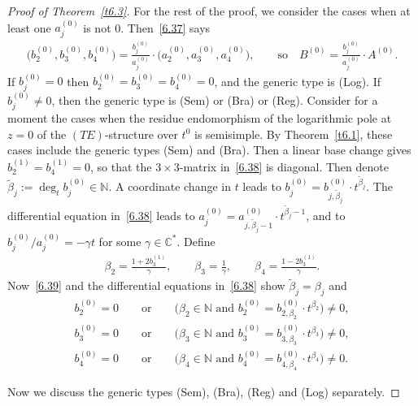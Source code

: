 \documentclass[pdftex]{sigma}%
\numberwithin{equation}{section}
\numberwithin{figure}{section}
\newcommand{\N}{{\mathbb N}}
\newcommand{\C}{{\mathbb C}}
\newcommand{\www}{\widetilde}
\begin{document}
\begin{proof}[Proof of Theorem~\ref{t6.3}]
For the rest of the proof, we consider the cases
when at least one $a_j^{(0)}$ is not 0.
Then~\eqref{6.37} says
\begin{gather}\label{6.39}
\big(b_2^{(0)},b_3^{(0)},b_4^{(0)}\big)=\frac{b_j^{(0)}}{a_j^{(0)}}
\cdot \big(a_2^{(0)},a_3^{(0)},a_4^{(0)}\big),\qquad
\text{so} \quad B^{(0)} = \frac{b_j^{(0)}}{a_j^{(0)}}\cdot A^{(0)}.
\end{gather}
If $b_j^{(0)}=0$ then $b_2^{(0)}=b_3^{(0)}=b_4^{(0)}=0$,
and the generic type is (Log).
If $b_j^{(0)}\neq 0$, then the generic type is
(Sem) or (Bra) or (Reg).
Consider for a moment the cases when the residue endomorphism
of the logarithmic pole at $z=0$ of the $(TE)$-structure
over $t^0$ is semisimple. By Theorem~\ref{t6.1}, these cases
include the generic types (Sem) and (Bra).
Then a linear base change gives $b_2^{(1)}=b_4^{(1)}=0$,
so that the $3\times 3$-matrix in~\eqref{6.38} is diagonal.
Then denote $\www\beta_j:=\deg_t b_j^{(0)}\in\N$.
A coordinate change in $t$ leads to
$b_j^{(0)}=b_{j,\www\beta_j}^{(0)}\cdot t^{\www\beta_j}$.
The differential equation in~\eqref{6.38} leads to
$a_j^{(0)}=a_{j,\www\beta_j-1}^{(0)}\cdot t^{\www\beta_j-1}$,
and to $b_j^{(0)}/a_j^{(0)}=-\gamma t$ for some $\gamma\in\C^*$.
Define
\begin{gather}\label{6.40}
\beta_2=\frac{1+2b_3^{(1)}}{\gamma},\qquad
\beta_3=\frac{1}{\gamma},\qquad
\beta_4=\frac{1-2b_3^{(1)}}{\gamma}.
\end{gather}
Now~\eqref{6.39} and the differential equations in~\eqref{6.38}
show $\www\beta_j=\beta_j$ and
\begin{gather}
b_2^{(0)}=0\qquad\text{or}\qquad\big(\beta_2\in\N\text{ and }
b_2^{(0)}=b_{2,\beta_2}^{(0)}\cdot t^{\beta_2}\big)\neq 0,
\nonumber
\\
b_3^{(0)}=0\qquad\text{or}\qquad\big(\beta_3\in\N\text{ and }
b_3^{(0)}=b_{3,\beta_3}^{(0)}\cdot t^{\beta_3}\big)\neq 0,
\label{6.41}
\\
b_4^{(0)}=0\qquad\text{or}\qquad\big(\beta_4\in\N\text{ and }
b_4^{(0)}=b_{4,\beta_4}^{(0)}\cdot t^{\beta_4}\big)\neq 0.
\nonumber
\end{gather}

Now we discuss the generic types (Sem), (Bra), (Reg)
and (Log) separately.


\end{proof}
\end{document}
